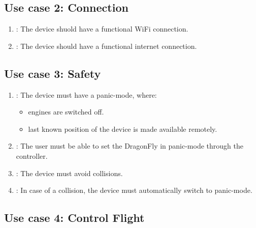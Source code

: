 \documentclass[a4paper]{article}
\makeatletter
\newcommand{\labitem}[2]{%
\def\@itemlabel{\textbf{#2}}
\item
\def\@currentlabel{#2}\label{#1}}
\makeatother
\begin{document}
\subsection{Use case 2: Connection}

\setlength{\parindent}{3cm}

\begin{enumerate}
\labitem{req:conn.1}{Connection.1}: The device shuold have a functional WiFi connection.
\labitem{req:conn.2}{Connection.2}: The device should have a functional internet connection.
\end{enumerate}

\subsection{Use case 3: Safety}

\begin{enumerate}
\labitem{req:safe.1}{Safety.1}: The device must have a panic-mode, where:
\begin{itemize}
\item engines are switched off.
\item last known position of the device is made available remotely.
\end{itemize}
\labitem{req:safe.2}{Safety.2}: The user must be able to set the DragonFly in panic-mode through the controller.
\labitem{req:safe.3}{Safety.3}: The device must avoid collisions.
\labitem{req:safe.4}{Safety.4}: In case of a collision, the device must automatically switch to panic-mode.
\end{enumerate}


\subsection{Use case 4: Control Flight}
\end{document}
